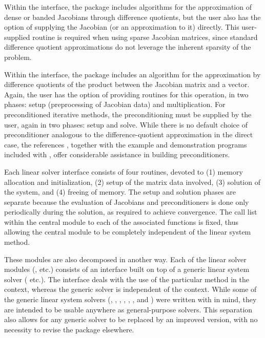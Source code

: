 Within the {\kindls} interface, the package includes algorithms for the
approximation of dense or banded Jacobians through difference 
quotients, but the user also has the option of supplying the Jacobian
(or an approximation to it) directly.  This user-supplied 
routine is required when using sparse Jacobian matrices, since
standard difference quotient approximations do not leverage the
inherent sparsity of the problem.

Within the {\kinspils} interface, the package includes an algorithm for
the approximation by difference quotients of the product between the Jacobian
matrix and a vector. Again,
the user has the option of providing routines for this operation, in
two phases: setup (preprocessing of Jacobian data) and multiplication.
For preconditioned iterative methods,  
the preconditioning must be supplied by the user, again in two phases: 
setup and solve.  While there is no
default choice of preconditioner analogous to the difference-quotient
approximation in the direct case, the references
\cite{BrHi:89,Byr:92}, together with the example and demonstration
programs included with {\kinsol}, offer considerable assistance in
building preconditioners. 

Each {\kinsol} linear solver interface consists of four routines, devoted to (1)
memory allocation and initialization, (2) setup of the matrix data
involved, (3) solution of the system, and (4) freeing of memory.
The setup and solution phases are separate because the evaluation of
Jacobians and preconditioners is done only periodically during the
solution, as required to achieve convergence. The call list within
the central {\kinsol} module to each of the associated functions is
fixed, thus allowing the central module to be completely independent
of the linear system method.

These modules are also decomposed in another way.
Each of the linear solver modules ({\kindense}, etc.) consists of an
interface built on top of a generic linear system solver ({\dense}
etc.).  The interface deals with the use of the particular method in
the {\kinsol} context, whereas the generic solver is independent of
the context.  While some of the generic linear system solvers
({\dense}, {\band}, {\spgmr}, {\spfgmr}, {\spbcg}, {\sptfqmr}, and {\pcg}) were written
with {\sundials} in mind, they are intended to be usable anywhere as
general-purpose solvers.  This separation also allows for any generic
solver to be replaced by an improved version, with no necessity to
revise the {\kinsol} package elsewhere. 

